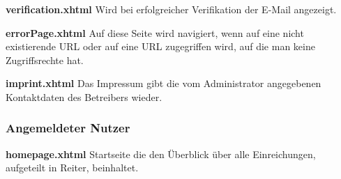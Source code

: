 \begin{samepage}
    \textbf{verification.xhtml} Wird bei erfolgreicher Verifikation der E-Mail angezeigt.
    \nopagebreak

\end{samepage}


\begin{samepage}
    \textbf{errorPage.xhtml} Auf diese Seite wird navigiert, wenn auf eine nicht existierende URL oder auf eine URL zugegriffen wird, auf die man keine Zugriffsrechte hat.
    \nopagebreak

\end{samepage}

\begin{samepage}
    \textbf{imprint.xhtml} Das Impressum gibt die vom Administrator angegebenen Kontaktdaten des Betreibers wieder.\nopagebreak

\end{samepage}

\subsubsection{Angemeldeter Nutzer}

\textbf{homepage.xhtml}\label{flt:homepage} Startseite die den Überblick über alle Einreichungen, aufgeteilt in Reiter, beinhaltet.

